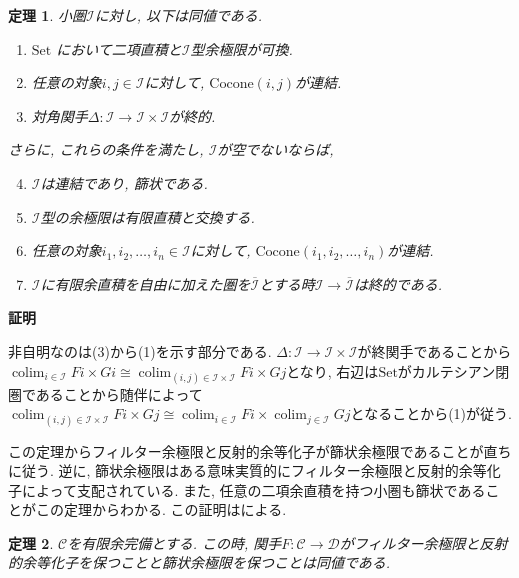 \documentclass{ltjsarticle}
\makeatletter
\theoremstyle{mystyle}
\newtheorem{theorem}{定理}[section]
\renewcommand{\proofname}{\textbf{証明}}
\renewenvironment{proof}[1][\proofname]{\par
  \pushQED{\qed}
  \normalfont \topsep6\p@\@plus6\p@\relax
  \trivlist
  \item\relax
  {#1\@addpunct{\newline\ignorespaces}}%
}{
  \popQED\endtrivlist\@endpefalse
}
\makeatother
\begin{document}
\begin{theorem}
   小圏$\mathcal I$に対し, 以下は同値である.
   \begin{enumerate}
    \item $\mathrm{Set}$ において二項直積と$\mathcal I$型余極限が可換.
    \item 任意の対象$i,j\in\mathcal I$に対して, $\mathrm{Cocone}(i,j)$が連結.
    \item 対角関手$\Delta:\mathcal I\to \mathcal I\times \mathcal I$が終的.
   \end{enumerate}
   さらに, これらの条件を満たし, $\mathcal I$が空でないならば, 
   \begin{enumerate}\setcounter{enumi}{3}
    \item $\mathcal I$は連結であり, 篩状である.
    \item $\mathcal I$型の余極限は有限直積と交換する.
    \item 任意の対象$i_1,i_2,\ldots,i_n\in\mathcal I$に対して, $\mathrm{Cocone}(i_1,i_2,\ldots,i_n)$が連結.
    \item $\mathcal I$に有限余直積を自由に加えた圏を$\overline{\mathcal I}$とする時$\mathcal I\to\overline{\mathcal I}$は終的である.
   \end{enumerate}
\end{theorem}
\begin{proof}
  非自明なのは(3)から(1)を示す部分である.
  $\Delta:\mathcal I\to \mathcal I\times \mathcal I$が終関手であることから$\operatorname{colim}_{i\in\mathcal I}Fi\times Gi\cong \operatorname{colim}_{(i,j)\in\mathcal I\times \mathcal{I}}Fi\times Gj$となり, 
  右辺は$\mathrm{Set}$がカルテシアン閉圏であることから随伴によって$\operatorname{colim}_{(i,j)\in\mathcal I\times \mathcal{I}}Fi\times Gj\cong \operatorname{colim}_{i\in\mathcal I}Fi\times\operatorname{colim}_{j\in\mathcal I} Gj$となることから(1)が従う.
\end{proof}
この定理からフィルター余極限と反射的余等化子が篩状余極限であることが直ちに従う. 逆に, 篩状余極限はある意味実質的にフィルター余極限と反射的余等化子によって支配されている.
また, 任意の二項余直積を持つ小圏も篩状であることがこの定理からわかる.
この証明は\cite{SiftedColim}による. 
\begin{theorem}\label{FilRefToSif}
  $\mathcal C$を有限余完備とする. 
  この時, 関手$F:\mathcal C\to\mathcal D$がフィルター余極限と反射的余等化子を保つことと篩状余極限を保つことは同値である.
\end{theorem}
\end{document}
